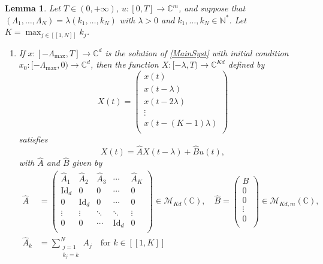 \documentclass[10pt]{article}
\newcommand{\llbracket}{[\![}
\newcommand{\rrbracket}{]\!]}
\theoremstyle{plain}
\newtheorem{lemm}[theo]{Lemma}
\theoremstyle{definition}
\DeclareMathOperator{\id}{Id}
\numberwithin{equation}{section}\numberwithin{figure}{section}\emergencystretch=3em
\begin{document}
\begin{lemm}
\label{LemmAAugm}
Let $T \in (0, +\infty)$, $u: [0, T] \to \mathbb C^m$, and suppose that $(\Lambda_1, \dots, \Lambda_N) = \lambda (k_1, \dots, k_N)$ with $\lambda > 0$ and $k_1, \dots,  k_N \in \mathbb N^\ast$. Let $K = \max_{j \in \llbracket 1, N\rrbracket} k_j$.
\begin{enumerate}
\item If $x: [-\Lambda_{\max}, T] \to \mathbb C^d$ is the solution of \eqref{MainSyst} with initial condition $x_0: [-\Lambda_{\max}, 0) \to \mathbb C^d$, then the function $X: [-\lambda, T) \to \mathbb C^{K d}$ defined by
\begin{equation}
\label{AugmX}
X(t) = \begin{pmatrix}
x(t) \\
x(t - \lambda) \\
x(t - 2\lambda) \\
\vdots \\
x(t - (K-1)\lambda) \\
\end{pmatrix}
\end{equation}
satisfies
\begin{equation}
\label{AugmSyst}
X(t) = \widehat A X(t - \lambda) + \widehat B u(t),
\end{equation}
with $\widehat A$ and $\widehat B$ given by
\begin{equation}
\label{AugmMat}
\begin{aligned}
\widehat A & = \begin{pmatrix}
\widehat A_1 & \widehat A_2 & \widehat A_3 & \cdots & \widehat A_K \\
\id_d & 0 & 0 & \cdots & 0 \\
0 & \id_d & 0 & \cdots & 0 \\
\vdots & \vdots & \ddots & \ddots & \vdots \\
0 & 0 & \cdots & \id_d & 0 \\
\end{pmatrix} \in \mathcal M_{Kd}(\mathbb C), \quad \widehat B = \begin{pmatrix}
B \\
0 \\
0 \\
\vdots \\
0 \\
\end{pmatrix} \in \mathcal M_{K d, m}(\mathbb C),\\
\widehat A_k & = \sum_{\substack{j = 1 \\ k_j = k}}^N A_j \quad \text{for } k \in \llbracket 1, K\rrbracket\\[-18pt]

\end{aligned}
\end{equation}
\end{enumerate}
\end{lemm}
\end{document}
